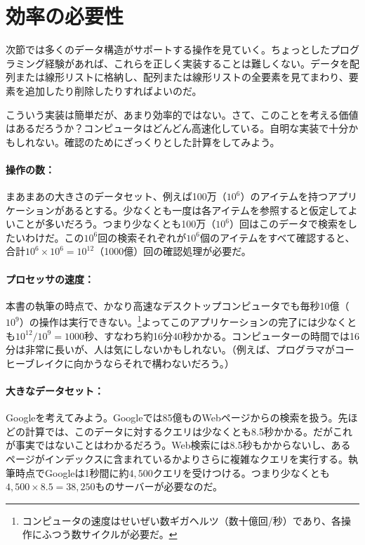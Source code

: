 \section{効率の必要性}

次節では多くのデータ構造がサポートする操作を見ていく。ちょっとしたプログラミング経験があれば、これらを正しく実装することは難しくない。データを配列または線形リストに格納し、配列または線形リストの全要素を見てまわり、要素を追加したり削除したりすればよいのだ。 %

こういう実装は簡単だが、あまり効率的ではない。さて、このことを考える価値はあるだろうか？コンピュータはどんどん高速化している。自明な実装で十分かもしれない。確認のためにざっくりとした計算をしてみよう。

\paragraph{操作の数：}
まあまあの大きさのデータセット、例えば100万（$10^6$）のアイテムを持つアプリケーションがあるとする。少なくとも一度は各アイテムを参照すると仮定してよいことが多いだろう。つまり少なくとも100万（$10^6$）回はこのデータで検索をしたいわけだ。この$10^6$回の検索それぞれが$10^6$個のアイテムをすべて確認すると、合計$10^6\times 10^6=10^{12}$（1000億）回の確認処理が必要だ。

\paragraph{プロセッサの速度：}
本書の執筆の時点で、かなり高速なデスクトップコンピュータでも毎秒10億（$10^9$）の操作は実行できない。\footnote{コンピュータの速度はせいぜい数ギガヘルツ（数十億回/秒）であり、各操作にふつう数サイクルが必要だ。}よってこのアプリケーションの完了には少なくとも$10^{12}/10^9=1000$秒、すなわち約16分40秒かかる。コンピューターの時間では16分は非常に長いが、人は気にしないかもしれない。（例えば、プログラマがコーヒーブレイクに向かうならそれで構わないだろう。）

\paragraph{大きなデータセット：}
Googleを考えてみよう。Googleでは85億ものWebページからの検索を扱う。先ほどの計算では、このデータに対するクエリは少なくとも8.5秒かかる。だがこれが事実ではないことはわかるだろう。Web検索には8.5秒もかからないし、あるページがインデックスに含まれているかよりさらに複雑なクエリを実行する。執筆時点でGoogleは1秒間に約$4,500$クエリを受けつける。つまり少なくとも$4,500 \times 8.5 = 38,250$ものサーバーが必要なのだ。

